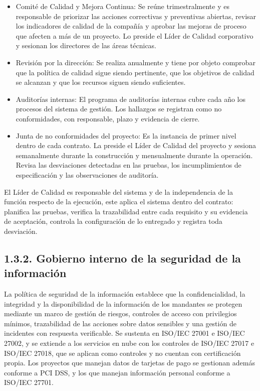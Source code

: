 \documentclass[11pt]{article}
\providecommand{\tightlist}{%
  \setlength{\itemsep}{0pt}\setlength{\parskip}{0pt}}
\begin{document}
\begin{itemize}
\tightlist
\item
  Comité de Calidad y Mejora Continua: Se reúne trimestralmente y es responsable de priorizar las acciones correctivas y preventivas abiertas, revisar los indicadores de calidad de la compañía y aprobar las mejoras de proceso que afecten a más de un proyecto. Lo preside el Líder de Calidad corporativo y sesionan los directores de las áreas técnicas.
\item
  Revisión por la dirección: Se realiza anualmente y tiene por objeto comprobar que la política de calidad sigue siendo pertinente, que los objetivos de calidad se alcanzan y que los recursos siguen siendo suficientes.
\item
  Auditorías internas: El programa de auditorías internas cubre cada año los procesos del sistema de gestión. Los hallazgos se registran como no conformidades, con responsable, plazo y evidencia de cierre.
\item
  Junta de no conformidades del proyecto: Es la instancia de primer nivel dentro de cada contrato. La preside el Líder de Calidad del proyecto y sesiona semanalmente durante la construcción y mensualmente durante la operación. Revisa las desviaciones detectadas en las pruebas, los incumplimientos de especificación y las observaciones de auditoría.
\end{itemize}

El Líder de Calidad es responsable del sistema y de la independencia de la función respecto de la ejecución, este aplica el sistema dentro del contrato: planifica las pruebas, verifica la trazabilidad entre cada requisito y su evidencia de aceptación, controla la configuración de lo entregado y registra toda desviación.

\subsection{1.3.2. Gobierno interno de la seguridad de la información}\label{gobierno-interno-de-la-seguridad-de-la-informaciuxf3n}

La política de seguridad de la información establece que la confidencialidad, la integridad y la disponibilidad de la información de los mandantes se protegen mediante un marco de gestión de riesgos, controles de acceso con privilegios mínimos, trazabilidad de las acciones sobre datos sensibles y una gestión de incidentes con respuesta verificable. Se sustenta en ISO/IEC 27001 e ISO/IEC 27002, y se extiende a los servicios en nube con los controles de ISO/IEC 27017 e ISO/IEC 27018, que se aplican como controles y no cuentan con certificación propia. Los proyectos que manejan datos de tarjetas de pago se gestionan además conforme a PCI DSS, y los que manejan información personal conforme a ISO/IEC 27701.
\end{document}
